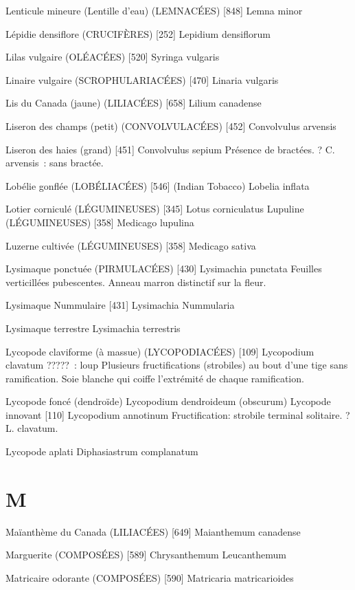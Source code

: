 \documentclass[book,12pt,a4paper,onecolumn,openany]{memoir}
\begin{document}
Lenticule mineure (Lentille d’eau) (LEMNACÉES)  [848]
				Lemna minor


Lépidie densiflore (CRUCIFÈRES)  [252]
				Lepidium densiflorum

Lilas vulgaire (OLÉACÉES)  [520]
				Syringa vulgaris

Linaire vulgaire (SCROPHULARIACÉES)  [470]
				Linaria vulgaris

Lis du Canada (jaune) (LILIACÉES)  [658]
				Lilium canadense

Liseron des champs (petit) (CONVOLVULACÉES)  [452]
				Convolvulus arvensis

Liseron des haies (grand)  [451]
				Convolvulus sepium
Présence de bractées. ? C. arvensis : sans bractée.

Lobélie gonflée (LOBÉLIACÉES)  [546] (Indian Tobacco)
				Lobelia inflata

Lotier corniculé (LÉGUMINEUSES)  [345]
				Lotus corniculatus
Lupuline (LÉGUMINEUSES)  [358]
				Medicago lupulina

Luzerne cultivée (LÉGUMINEUSES)  [358]
				Medicago sativa

Lysimaque ponctuée (PIRMULACÉES)  [430]
				Lysimachia punctata
Feuilles verticillées pubescentes.
Anneau marron distinctif sur la fleur.

Lysimaque Nummulaire  [431]
				Lysimachia Nummularia

Lysimaque terrestre
				Lysimachia terrestris

Lycopode claviforme (à massue) (LYCOPODIACÉES)  [109]
				Lycopodium clavatum
????? : loup
Plusieurs fructifications (strobiles) au bout d’une tige sans ramification.
Soie blanche qui coiffe l’extrémité de chaque ramification.

Lycopode foncé (dendroïde) 
				Lycopodium dendroideum (obscurum)
Lycopode innovant  [110]
				Lycopodium annotinum
Fructification: strobile terminal solitaire.
? L. clavatum.

Lycopode aplati
				Diphasiastrum complanatum

\chapter*{M}

Maïanthème du Canada (LILIACÉES)  [649]
				Maianthemum canadense

Marguerite (COMPOSÉES)  [589]
				Chrysanthemum Leucanthemum

Matricaire odorante (COMPOSÉES)  [590]
				Matricaria matricarioides
\end{document}
